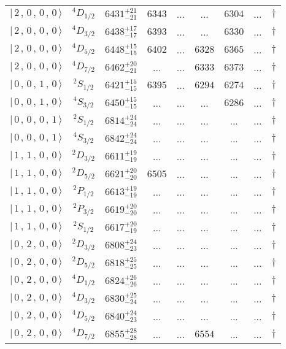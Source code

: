 \begin{tabular}{c c| c c c c c c c}
$\vert \,2\,,\,0\,,\,0\,,\,0 \,\rangle $ & $^{4}D_{1/2}$ & $6431^{+21}_{-21}$ & $6343$ & ... & ... & $6304$ & ... & $\dagger$ \\ 
$\vert \,2\,,\,0\,,\,0\,,\,0 \,\rangle $ & $^{4}D_{3/2}$ & $6438^{+17}_{-17}$ & $6393$ & ... & ... & $6330$ & ... & $\dagger$ \\ 
$\vert \,2\,,\,0\,,\,0\,,\,0 \,\rangle $ & $^{4}D_{5/2}$ & $6448^{+15}_{-15}$ & $6402$ & ... & $6328$ & $6365$ & ... & $\dagger$ \\ 
$\vert \,2\,,\,0\,,\,0\,,\,0 \,\rangle $ & $^{4}D_{7/2}$ & $6462^{+20}_{-21}$ & ... & ... & $6333$ & $6373$ & ... & $\dagger$ \\ 
$\vert \,0\,,\,0\,,\,1\,,\,0 \,\rangle $ & $^{2}S_{1/2}$ & $6421^{+15}_{-15}$ & $6395$ & ... & $6294$ & $6274$ & ... & $\dagger$ \\ 
$\vert \,0\,,\,0\,,\,1\,,\,0 \,\rangle $ & $^{4}S_{3/2}$ & $6450^{+15}_{-15}$ & ... & ... & ... & $6286$ & ... & $\dagger$ \\ 
$\vert \,0\,,\,0\,,\,0\,,\,1 \,\rangle $ & $^{2}S_{1/2}$ & $6814^{+24}_{-24}$ & ... & ... & ... & ... & ... & $\dagger$ \\ 
$\vert \,0\,,\,0\,,\,0\,,\,1 \,\rangle $ & $^{4}S_{3/2}$ & $6842^{+24}_{-24}$ & ... & ... & ... & ... & ... & $\dagger$ \\ 
$\vert \,1\,,\,1\,,\,0\,,\,0 \,\rangle $ & $^{2}D_{3/2}$ & $6611^{+19}_{-19}$ & ... & ... & ... & ... & ... & $\dagger$ \\ 
$\vert \,1\,,\,1\,,\,0\,,\,0 \,\rangle $ & $^{2}D_{5/2}$ & $6621^{+20}_{-20}$ & $6505$ & ... & ... & ... & ... & $\dagger$ \\ 
$\vert \,1\,,\,1\,,\,0\,,\,0 \,\rangle $ & $^{2}P_{1/2}$ & $6613^{+19}_{-19}$ & ... & ... & ... & ... & ... & $\dagger$ \\ 
$\vert \,1\,,\,1\,,\,0\,,\,0 \,\rangle $ & $^{2}P_{3/2}$ & $6619^{+20}_{-20}$ & ... & ... & ... & ... & ... & $\dagger$ \\ 
$\vert \,1\,,\,1\,,\,0\,,\,0 \,\rangle $ & $^{2}S_{1/2}$ & $6617^{+20}_{-19}$ & ... & ... & ... & ... & ... & $\dagger$ \\ 
$\vert \,0\,,\,2\,,\,0\,,\,0 \,\rangle $ & $^{2}D_{3/2}$ & $6808^{+24}_{-23}$ & ... & ... & ... & ... & ... & $\dagger$ \\ 
$\vert \,0\,,\,2\,,\,0\,,\,0 \,\rangle $ & $^{2}D_{5/2}$ & $6818^{+25}_{-25}$ & ... & ... & ... & ... & ... & $\dagger$ \\ 
$\vert \,0\,,\,2\,,\,0\,,\,0 \,\rangle $ & $^{4}D_{1/2}$ & $6824^{+26}_{-26}$ & ... & ... & ... & ... & ... & $\dagger$ \\ 
$\vert \,0\,,\,2\,,\,0\,,\,0 \,\rangle $ & $^{4}D_{3/2}$ & $6830^{+25}_{-24}$ & ... & ... & ... & ... & ... & $\dagger$ \\ 
$\vert \,0\,,\,2\,,\,0\,,\,0 \,\rangle $ & $^{4}D_{5/2}$ & $6840^{+24}_{-23}$ & ... & ... & ... & ... & ... & $\dagger$ \\ 
$\vert \,0\,,\,2\,,\,0\,,\,0 \,\rangle $ & $^{4}D_{7/2}$ & $6855^{+28}_{-28}$ & ... & ... & $6554$ & ... & ... & $\dagger$ \\ 
\hline \hline
\end{tabular}
